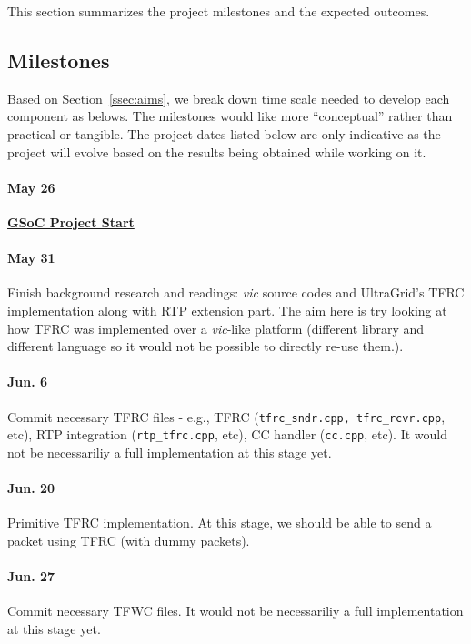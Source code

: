 
This section summarizes the project milestones and the expected outcomes.

\subsection{\label{ssec:plan}Milestones}

Based on Section~\ref{ssec:aims}, we break down time scale needed to develop
each component as belows. The milestones would like more ``conceptual'' rather
than practical or tangible. The project dates listed below are only indicative
as the project will evolve based on the results being obtained while working on
it.

\paragraph{\textsf{May 26}} \underline{\textbf{GSoC Project Start}}

\paragraph{\textsf{May 31}} Finish background research and readings: \emph{vic} source
codes and UltraGrid's TFRC implementation along with RTP extension part.  The
aim here is try looking at how TFRC was implemented over a \emph{vic}-like platform
(different library and different language so it would not be possible to
directly re-use them.).

\paragraph{\textsf{Jun. 6}} Commit necessary TFRC files - e.g., TFRC
(\texttt{tfrc\_sndr.cpp, tfrc\_rcvr.cpp}, etc), RTP integration
(\texttt{rtp\_tfrc.cpp}, etc), CC handler (\texttt{cc.cpp}, etc). It would not
be necessariliy a full implementation at this stage yet.

\paragraph{\textsf{Jun. 20}} Primitive TFRC implementation. At this stage, we
should be able to send a packet using TFRC (with dummy packets).

\paragraph{\textsf{Jun. 27}} Commit necessary TFWC files. It would not be
necessariliy a full implementation at this stage yet.


